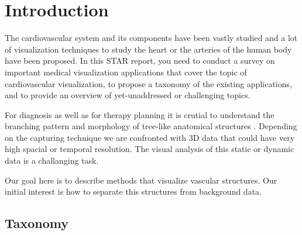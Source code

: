 \section{Introduction}

The cardiovascular system and its components have been vastly studied and a lot 
of visualization techniques to study the heart or the arteries of the human body 
have  been  proposed.  In  this  STAR  report,  you  need  to  conduct  a  survey  on 
important  medical  visualization  applications  that  cover  the  topic  of 
cardiovascular visualization, to propose a taxonomy of the existing applications, 
and to provide an overview of yet-unaddressed or challenging topics.  

For diagnosis as well as for therapy planning it is crutial to understand the branching pattern and morphology of tree-like anatomical structures \cite{preim2013visual}.
Depending on the capturing technique we are confronted with 3D data that could have very high spacial or temporal resolution. The visual analysis of this static or dynamic data is a challanging task.

Our goal here is to describe methods that visualize vascular structures. Our initial interest is how to separate this structures from background data. 


\subsection{Taxonomy}

